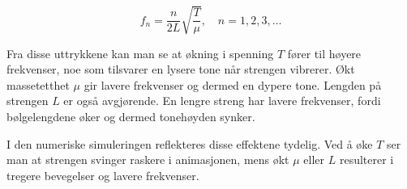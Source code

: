 \begin{equation*}
f_n = \frac{n}{2L} \sqrt{\frac{T}{\mu}}, \quad n=1,2,3,\ldots
\end{equation*}

Fra disse uttrykkene kan man se at økning i spenning \( T \) fører til høyere frekvenser, noe som tilsvarer en lysere tone når strengen vibrerer. Økt massetetthet \( \mu \) gir lavere frekvenser og dermed en dypere tone. Lengden på strengen \( L \) er også avgjørende. En lengre streng har lavere frekvenser, fordi bølgelengdene øker og dermed tonehøyden synker.

I den numeriske simuleringen reflekteres disse effektene tydelig. Ved å øke \( T \) ser man at strengen svinger raskere i animasjonen, mens økt \( \mu \) eller \( L \) resulterer i tregere bevegelser og lavere frekvenser.